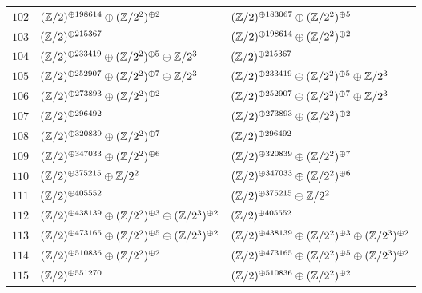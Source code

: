 \begin{supertabular}{|c|p{5.5cm}|p{5.5cm}|}
$102$%
&$(\mathbb{Z}/2)^{\oplus198614}\oplus(\mathbb{Z}/2^{2})^{\oplus2}$%
&$(\mathbb{Z}/2)^{\oplus183067}\oplus(\mathbb{Z}/2^{2})^{\oplus5}$\\

$103$%
&$(\mathbb{Z}/2)^{\oplus215367}$%
&$(\mathbb{Z}/2)^{\oplus198614}\oplus(\mathbb{Z}/2^{2})^{\oplus2}$\\

$104$%
&$(\mathbb{Z}/2)^{\oplus233419}\oplus(\mathbb{Z}/2^{2})^{\oplus5}\oplus\mathbb{Z}/2^{3}$%
&$(\mathbb{Z}/2)^{\oplus215367}$\\

$105$%
&$(\mathbb{Z}/2)^{\oplus252907}\oplus(\mathbb{Z}/2^{2})^{\oplus7}\oplus\mathbb{Z}/2^{3}$%
&$(\mathbb{Z}/2)^{\oplus233419}\oplus(\mathbb{Z}/2^{2})^{\oplus5}\oplus\mathbb{Z}/2^{3}$\\

$106$%
&$(\mathbb{Z}/2)^{\oplus273893}\oplus(\mathbb{Z}/2^{2})^{\oplus2}$%
&$(\mathbb{Z}/2)^{\oplus252907}\oplus(\mathbb{Z}/2^{2})^{\oplus7}\oplus\mathbb{Z}/2^{3}$\\

$107$%
&$(\mathbb{Z}/2)^{\oplus296492}$%
&$(\mathbb{Z}/2)^{\oplus273893}\oplus(\mathbb{Z}/2^{2})^{\oplus2}$\\

$108$%
&$(\mathbb{Z}/2)^{\oplus320839}\oplus(\mathbb{Z}/2^{2})^{\oplus7}$%
&$(\mathbb{Z}/2)^{\oplus296492}$\\

$109$%
&$(\mathbb{Z}/2)^{\oplus347033}\oplus(\mathbb{Z}/2^{2})^{\oplus6}$%
&$(\mathbb{Z}/2)^{\oplus320839}\oplus(\mathbb{Z}/2^{2})^{\oplus7}$\\

$110$%
&$(\mathbb{Z}/2)^{\oplus375215}\oplus\mathbb{Z}/2^{2}$%
&$(\mathbb{Z}/2)^{\oplus347033}\oplus(\mathbb{Z}/2^{2})^{\oplus6}$\\

$111$%
&$(\mathbb{Z}/2)^{\oplus405552}$%
&$(\mathbb{Z}/2)^{\oplus375215}\oplus\mathbb{Z}/2^{2}$\\

$112$%
&$(\mathbb{Z}/2)^{\oplus438139}\oplus(\mathbb{Z}/2^{2})^{\oplus3}\oplus(\mathbb{Z}/2^{3})^{\oplus2}$%
&$(\mathbb{Z}/2)^{\oplus405552}$\\

$113$%
&$(\mathbb{Z}/2)^{\oplus473165}\oplus(\mathbb{Z}/2^{2})^{\oplus5}\oplus(\mathbb{Z}/2^{3})^{\oplus2}$%
&$(\mathbb{Z}/2)^{\oplus438139}\oplus(\mathbb{Z}/2^{2})^{\oplus3}\oplus(\mathbb{Z}/2^{3})^{\oplus2}$\\

$114$%
&$(\mathbb{Z}/2)^{\oplus510836}\oplus(\mathbb{Z}/2^{2})^{\oplus2}$%
&$(\mathbb{Z}/2)^{\oplus473165}\oplus(\mathbb{Z}/2^{2})^{\oplus5}\oplus(\mathbb{Z}/2^{3})^{\oplus2}$\\

$115$%
&$(\mathbb{Z}/2)^{\oplus551270}$%
&$(\mathbb{Z}/2)^{\oplus510836}\oplus(\mathbb{Z}/2^{2})^{\oplus2}$\\


\end{supertabular}

